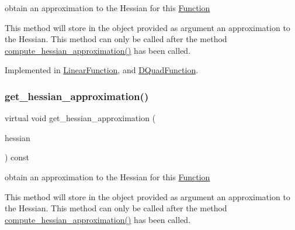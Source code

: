 obtain an approximation to the Hessian for this \mbox{\hyperlink{class_s_m_spp__di__unipi__it_1_1_function}{Function}} 

This method will store in the object provided as argument an approximation to the Hessian. This method can only be called after the method \mbox{\hyperlink{class_s_m_spp__di__unipi__it_1_1_c15_function_a50c8f5b1802c658a795d266ba66e3c29}{compute\+\_\+hessian\+\_\+approximation()}} has been called. 

Implemented in \mbox{\hyperlink{class_s_m_spp__di__unipi__it_1_1_linear_function_a7ebd74c022ea1a7747ba8efe72d3e512}{Linear\+Function}}, and \mbox{\hyperlink{class_s_m_spp__di__unipi__it_1_1_d_quad_function_a15b274da02800dcbec12695a689b327f}{D\+Quad\+Function}}.

\mbox{\label{class_s_m_spp__di__unipi__it_1_1_c15_function_a5e5b31d85711c9e27252b7af6ff7e214}} 
\subsubsection{\texorpdfstring{get\+\_\+hessian\+\_\+approximation()}{get\_hessian\_approximation()}\hspace{0.1cm}{\footnotesize\ttfamily [2/2]}}
{\footnotesize\ttfamily virtual void get\+\_\+hessian\+\_\+approximation (\begin{DoxyParamCaption}\item[{\mbox{\hyperlink{class_s_m_spp__di__unipi__it_1_1_c15_function_af95b7c5c0969f493222b30b17aa58515}{Sparse\+Hessian}} \&}]{hessian }\end{DoxyParamCaption}) const\hspace{0.3cm}{\ttfamily [pure virtual]}}



obtain an approximation to the Hessian for this \mbox{\hyperlink{class_s_m_spp__di__unipi__it_1_1_function}{Function}} 

This method will store in the object provided as argument an approximation to the Hessian. This method can only be called after the method \mbox{\hyperlink{class_s_m_spp__di__unipi__it_1_1_c15_function_a50c8f5b1802c658a795d266ba66e3c29}{compute\+\_\+hessian\+\_\+approximation()}} has been called. 

